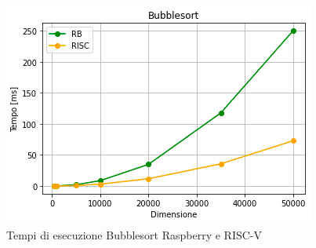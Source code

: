 \documentclass[12pt, a4paper]{report}
\begin{document}
\begin{figure}[ht]
\centering
	\includegraphics[scale=0.8]{Bubblesort_RB_RISC.PNG}
	\caption{Tempi di esecuzione Bubblesort Raspberry e RISC-V}
	\label{GrafBubble}
\end{figure}
\end{document}
